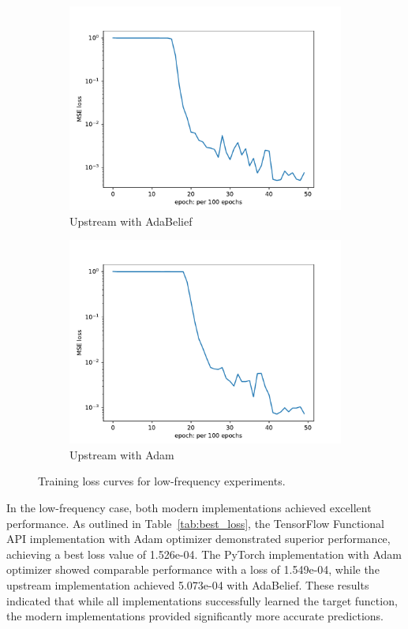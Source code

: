 \documentclass[10pt,journal,compsoc,onecolumn]{IEEEtran}
\begin{document}
\begin{figure}[htbp]
\begin{subfigure}[b]{0.45\textwidth}
        \includegraphics[width=\textwidth]{../../results/upstream/low-frequency-adabelief-20250206-1105-3/loss}
        \caption{Upstream with AdaBelief}
    \end{subfigure}
    \begin{subfigure}[b]{0.45\textwidth}
        \includegraphics[width=\textwidth]{../../results/upstream/low-frequency-adam-20250206-1105-4/loss}
        \caption{Upstream with Adam}
    \end{subfigure}
    \caption{Training loss curves for low-frequency experiments.}
    \label{fig:results_low}
\end{figure}

In the low-frequency case, both modern implementations achieved excellent performance. As outlined in Table~\ref{tab:best_loss}, the TensorFlow Functional API implementation with Adam optimizer demonstrated superior performance, achieving a best loss value of 1.526e-04. The PyTorch implementation with Adam optimizer showed comparable performance with a loss of 1.549e-04, while the upstream implementation achieved 5.073e-04 with AdaBelief. These results indicated that while all implementations successfully learned the target function, the modern implementations provided significantly more accurate predictions.
\end{document}
